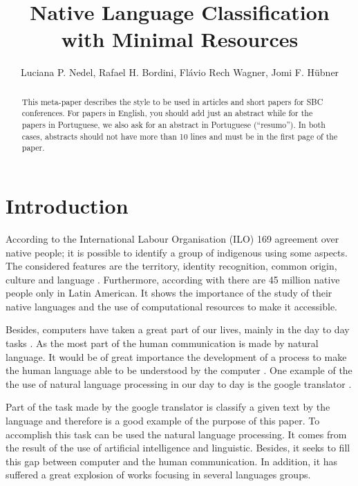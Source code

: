 \documentclass[12pt]{article}
\title{Native Language Classification\\ with Minimal Resources}
\author{Luciana P. Nedel\inst{1}, Rafael H. Bordini\inst{2}, Flávio Rech
  Wagner\inst{1}, Jomi F. Hübner\inst{3} }
\begin{document}
\maketitle

\begin{abstract}
  This meta-paper describes the style to be used in articles and short papers
  for SBC conferences.
  For papers in English, you should add just an abstract
  while for the papers in Portuguese, we also ask for an abstract in
  Portuguese (``resumo'').
  In both cases, abstracts should not have more than
  10 lines and must be in the first page of the paper.
\end{abstract}


\section{Introduction}\label{sec:introduction}

According to the International Labour Organisation (ILO) 169 agreement over native people;
it is possible to identify a group of indigenous using some aspects.
The considered features are the territory, identity recognition, common origin, culture and language \cite{povos_indigenas}.
Furthermore, according with \cite{povos_indigenas} there are 45 million native people only in Latin American.
It shows the importance of the study of their native languages and the use of computational resources to make it accessible.

Besides, computers have taken a great part of our lives, mainly in the day to day tasks \cite{matthews2016introduction}.
As the most part of the human communication is made by natural language\cite{matthews2016introduction}.
It would be of great importance the development of a process to make the human language able to be understood by the computer \cite{matthews2016introduction}.
One example of the the use of natural language processing in our day to day is the google translator \cite{google}.


Part of the task made by the google translator is classify a given text by the language and therefore is a good example of the purpose of this paper.
To accomplish this task can be used the natural language processing.
It comes from the result of the use of artificial intelligence and linguistic\cite{10.1136/amiajnl-2011-000464}.
Besides, it seeks to fill this gap between computer and the human communication.
 In addition, it has suffered a great explosion of works focusing in several languages groups\cite{peters2002evaluation}.
\end{document}
